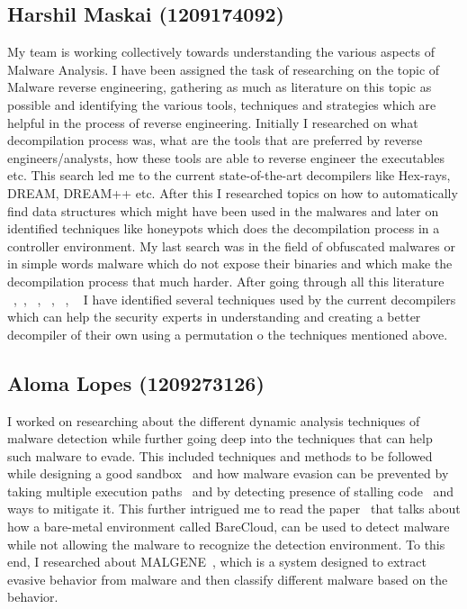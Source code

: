 \documentclass[11pt]{article}
\begin{document}
\subsection{Harshil Maskai (1209174092)}
My team is working collectively towards understanding the various aspects of Malware Analysis. I have been assigned the task of researching on the topic of Malware reverse engineering, gathering as much as literature on this topic as possible and identifying the various tools, techniques and strategies which are helpful in the process of reverse engineering. Initially I researched on what decompilation process was, what are the tools that are preferred by reverse engineers/analysts, how these tools are able to reverse engineer the executables etc. This search led me to the current state-of-the-art decompilers like Hex-rays, DREAM, DREAM++ etc. After this I researched topics on how to automatically find data structures which might have been used in the malwares and later on identified techniques like honeypots which does the decompilation process in a controller environment. My last search was in the field of obfuscated malwares or in simple words malware which do not expose their binaries and which make the decompilation process that much harder.
After going through all this literature ~\cite{yakdan2016helping},~\cite{guilfanov2008decompilers}, ~\cite{yakdan2015no}, ~\cite{lin2010automatic}, ~\cite{honeypot2016}, ~\cite{rotalumegatech} I have identified several techniques used by the current decompilers which can help the security experts in understanding and creating a better decompiler of their own using a permutation o the techniques mentioned above.


\subsection{Aloma Lopes (1209273126)}
I worked on researching about the different dynamic analysis techniques of malware detection while further going deep into the techniques that can help such malware to evade. This included techniques and methods to be followed while designing a good sandbox~\cite{kruegel2014full} and how malware evasion can be prevented by taking multiple execution paths~\cite{moser2007exploring} and by detecting presence of stalling code~\cite{kolbitsch2011power} and ways to mitigate it. This further intrigued me to read the paper~\cite{kirat2014barecloud} that talks about how a bare-metal environment called BareCloud, can be used to detect malware while not allowing the malware to recognize the detection environment. To this end, I researched about MALGENE~\cite{kirat2015malgene}, which is a system designed to extract evasive behavior from malware and then classify different malware based on the behavior.
\end{document}
